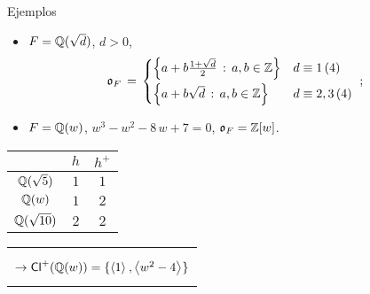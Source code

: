 \begin{frame}{Ejemplos}
	\begin{itemize}
		\item $F=\mathbb{Q}(\sqrt{d})$, $d>0$,
			\begin{align*}
				\mathfrak{o}_{F} & \,=\,
				\begin{cases}
					\Big\{a+b\tfrac{1+\sqrt d}{2}\,:\,
						a,b\in\mathbb{Z}\Big\}
						& d\equiv 1\,(4) \\[5pt]
					\Big\{a+b\sqrt d\,:\,a,b\in\mathbb{Z}\Big\}
						& d\equiv2,3\,(4)
				\end{cases}
				\text{ ;}
			\end{align*}
		\item $F=\mathbb{Q}(w)$, $w^3 - w^2 - 8\,w + 7=0$,
			$\mathfrak{o}_{F}=\mathbb{Z}[w]$.
	\end{itemize}
	\begin{center}
	\begin{tabular}{c|c|c}
		& $h$ & $h^{+}$ \\
		\hline
		$\mathbb{Q}(\sqrt{5})$ & $1$ & $1$ \\
		$\mathbb{Q}(w)$ & $1$ & $2$ \\
		$\mathbb{Q}(\sqrt{10})$ & $2$ & $2$
	\end{tabular}
	\begin{tabular}{c}
		\vphantom{$h^{+}$} \\
		\vphantom{$\bb Q(\sqrt 5)$} \\
		\vphantom{$\bb Q(w)$}
			\begin{math}
				\rightarrow \mathsf{Cl}^{+}(\mathbb{Q}(w)) =
				\{\left\langle{1}\right\rangle_{},\left\langle{w^2 -4}\right\rangle_{}\}
			\end{math} \\
		\vphantom{$\bb Q(\sqrt 10)$}
	\end{tabular}
	\end{center}
\end{frame}

